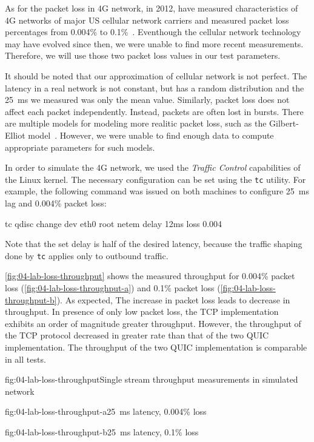 As for the packet loss in 4G network, in 2012, \citeauthor{measuring4G} have measured
characteristics of 4G networks of major US cellular network carriers and measured packet loss
percentages from 0.004\% to 0.1\%~\cite{measuring4G}. Eventhough the cellular network technology may
have evolved since then, we were unable to find more recent measurements. Therefore, we will use
those two packet loss values in our test parameters.

It should be noted that our approximation of cellular network is not perfect. The latency in a real
network is not constant, but has a random distribution and the \SI{25}{\milli\second} we measured
was only the mean value. Similarly, packet loss does not affect each packet independently. Instead,
packets are often lost in bursts. There are multiple models for modeling more realitic packet loss,
such as the Gilbert-Elliot model~\cite{wiki:burst-error}. However, we were unable to find enough
data to compute appropriate parameters for such models.

In order to simulate the 4G network, we used the \textit{Traffic Control} capabilities of the Linux
kernel. The necessary configuration can be set using the \texttt{tc} utility. For example, the
following command was issued on both machines to configure \SI{25}{\milli\second} lag and 0.004\%
packet loss:

\begin{myVerbatim}
tc qdisc change dev eth0 root netem delay 12ms loss 0.004%
\end{myVerbatim}

Note that the set delay is half of the desired latency, because the traffic shaping done by
\texttt{tc} applies only to outbound traffic.

\autoref{fig:04-lab-loss-throughput} shows the measured throughput for 0.004\% packet loss
(\autoref{fig:04-lab-loss-throughput-a}) and 0.1\% packet loss
(\autoref{fig:04-lab-loss-throughput-b}). As expected, The increase in packet loss leads to decrease
in throughput. In presence of only low packet loss, the TCP implementation exhibits an order of
magnitude greater throughput. However, the throughput of the TCP protocol decreased in greater rate
than that of the two QUIC implementation. The throughput of the two QUIC implementation is
comparable in all tests.

\begin{myFigure}{fig:04-lab-loss-throughput}{Single stream throughput measurements in simulated network}
\begin{mySubfigure}{0.49\linewidth}{fig:04-lab-loss-throughput-a}{\SI{25}{\milli\second} latency, 0.004\% loss}
\footnotesize

\end{mySubfigure}
\begin{mySubfigure}{0.49\linewidth}{fig:04-lab-loss-throughput-b}{\SI{25}{\milli\second} latency, 0.1\% loss}
\footnotesize

\end{mySubfigure}
\end{myFigure}

